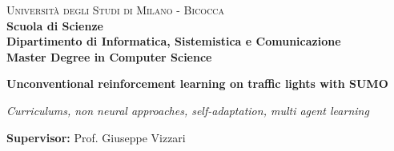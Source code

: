 \documentclass[a4paper,10pt,twoside]{book}
\begin{document}
    
    \begin{titlepage}
        
        \noindent
        \begin{minipage}[t]{0.19\textwidth}
        \end{minipage}
        \begin{minipage}[t]{0.81\textwidth}
        {
                {\textsc{Università degli Studi di Milano - Bicocca}} \\
                \textbf{Scuola di Scienze} \\
                \textbf{Dipartimento di Informatica, Sistemistica e Comunicazione} \\
                \textbf{Master Degree in Computer Science} \\
                \par
        }
        \end{minipage}
        
	\vspace{40mm}
        
	\begin{center}
            {\LARGE{
                    \textbf{Unconventional reinforcement learning on traffic lights with SUMO}
                    \par
            }}
            {\large{
                    \textit{Curriculums, non neural approaches, self-adaptation, multi agent learning}
                    \par
            }}
        \end{center}
        
        \vspace{50mm}

        \noindent
        {\large \textbf{Supervisor:} Prof. Giuseppe Vizzari}
        
        \vspace{15mm}


\end{titlepage}
\end{document}
